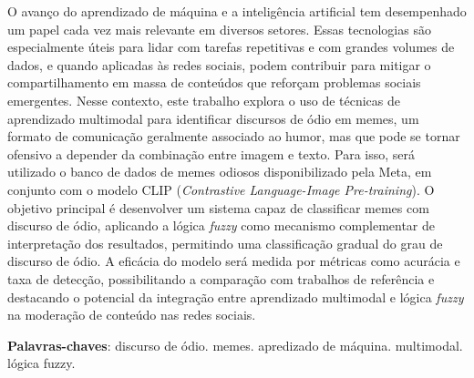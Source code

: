 \setlength{\absparsep}{18pt}
\begin{resumo}

O avanço do aprendizado de máquina e a inteligência artificial tem desempenhado um papel cada vez mais relevante em diversos setores. Essas tecnologias são especialmente úteis para lidar com tarefas repetitivas e com grandes volumes de dados, e quando aplicadas às redes sociais, podem contribuir para mitigar o compartilhamento em massa de conteúdos que reforçam problemas sociais emergentes. Nesse contexto, este trabalho explora o uso de técnicas de aprendizado multimodal para identificar discursos de ódio em memes, um formato de comunicação geralmente associado ao humor, mas que pode se tornar ofensivo a depender da combinação entre imagem e texto. Para isso, será utilizado o banco de dados de memes odiosos disponibilizado pela Meta, em conjunto com o modelo CLIP (\textit{Contrastive Language-Image Pre-training}). O objetivo principal é desenvolver um sistema capaz de classificar memes com discurso de ódio, aplicando a lógica \textit{fuzzy} como mecanismo complementar de interpretação dos resultados, permitindo uma classificação gradual do grau de discurso de ódio. A eficácia do modelo será medida por métricas como acurácia e taxa de detecção, possibilitando a comparação com trabalhos de referência e destacando o potencial da integração entre aprendizado multimodal e lógica \textit{fuzzy} na moderação de conteúdo nas redes sociais.

 \textbf{Palavras-chaves}: discurso de ódio. memes. apredizado de máquina. multimodal. lógica fuzzy.
\end{resumo}
